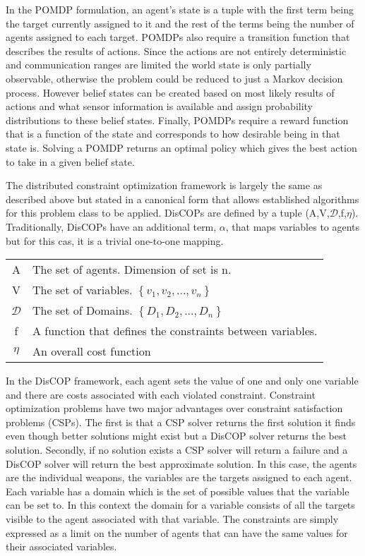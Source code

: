 \documentclass{article}
\begin{document}
In the POMDP formulation, an agent's state is a tuple with the first term being the target currently assigned to it and the rest of the terms being the number of agents assigned to each target.  POMDPs also require a transition function that describes the results of actions. Since the actions are not entirely deterministic and communication ranges are limited the world state is only partially observable, otherwise the problem could be reduced to just a Markov decision process. However belief states can be created based on most likely results of actions and what sensor information is available and assign probability distributions to these belief states. Finally, POMDPs require a reward function that is a function of the state and corresponds to how desirable being in that state is. Solving a POMDP returns an optimal policy which gives the best action to take in a given belief state.

The distributed constraint optimization framework is largely the same as described above but stated in a canonical form that allows established algorithms for this problem class to be applied. DisCOPs are defined by a tuple (A,V,$\mathcal{D}$,f,$\eta$). Traditionally, DisCOPs have an additional term, $\alpha$, that maps variables to agents but for this cas, it is a trivial one-to-one mapping.
\begin{table}[h!]
\centering
\begin{tabular}{cl}
A &The set of agents. Dimension of set is n.\\
V &The set of variables. $\left\{v_{1},v_{2},...,v_{n}\right\}$\\
$\mathcal{D}$ &The set of Domains. $\left\lbrace D_{1},D_{2},...,D_{n}\right\rbrace$\\
f &A function that defines the constraints between variables.\\
$\eta$ &An overall cost function
\end{tabular}
\end{table}

In the DisCOP framework, each agent sets the value of one and only one variable and there are costs associated with each violated constraint. Constraint optimization problems have two major advantages over constraint satisfaction problems (CSPs). The first is that a CSP solver returns the first solution it finds even though better solutions might exist but a DisCOP solver returns the best solution. Secondly, if no solution exists a CSP solver will return a failure and a DisCOP solver will return  the best approximate solution. In this case, the agents are the individual weapons, the variables are the targets assigned to each agent. Each variable has a domain which is the set of possible values that the variable can be set to. In this context the domain for a variable consists of all the targets visible to the agent associated with that variable. The constraints are simply expressed as a limit on the number of agents that can have the same values for their associated variables.
\end{document}
